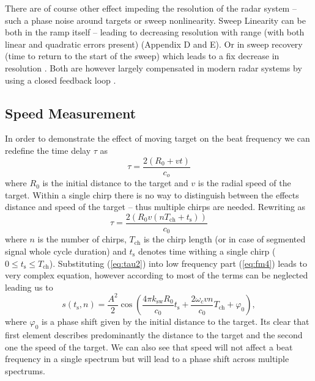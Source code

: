 There are of course other effect impeding the resolution of the radar system -- such a phase noise around targets or sweep nonlinearity.
Sweep Linearity can be both in the ramp itself -- leading to decreasing resolution with range (with both linear and quadratic errors present) \cite{graham2005} (Appendix D and E).
Or in sweep recovery (time to return to the start of the sweep) which leads to a fix decrease in resolution \cite{piper1995}.
Both are however largely compensated in modern radar systems by using a closed feedback loop \cite{graham2005}.


\subsection{Speed Measurement}

In order to demonstrate the effect of moving target on the beat frequency we can redefine the time delay $\tau$ as
\begin{equation}
  \tau = \frac{2(R_0+vt)}{c_o}
  \label{eq:tau}
\end{equation}
where $R_0$ is the initial distance to the target and $v$ is the radial speed of the target.
Within a single chirp there is no way to distinguish between the effects distance and speed of the target -- thus multiple chirps are needed.
Rewriting \label{eq:tau} as
\begin{equation}
  \tau = \frac{2(R_0 v(nT_\mathrm{ch} + t_\mathrm{s}))}{c_0}
  \label{eq:tau2}
\end{equation}
where $n$ is the number of chirps, $T_\mathrm{ch}$ is the chirp length (or in case of segmented signal whole cycle duration) and $t_\mathrm{s}$ denotes time withing  a single chirp ($0 \leq t_\mathrm{s} \leq T_\mathrm{ch}$).
Substituting (\ref{eq:tau2}) into low frequency part (\ref{eq:fm4}) leads to very complex equation, however according to \cite{suleymanov2016} most of the terms can be neglected leading us to
\begin{equation}
  s(t_\mathrm{s}, n) = \frac{A^2}{2} \cos\left(\frac{4\pi k_\mathrm{sw} R_0}{c_0} t_\mathrm{s} + \frac{2\omega_c v n}{c_0} T_\mathrm{ch} + \varphi_0 \right),
  \label{eq:fb2}
\end{equation}
where $\varphi_0$ is a phase shift given by the initial distance to the target.
Its clear that first element describes predominantly the distance to the target and the second one the speed of the target.
We can also see that speed will not affect a beat frequency in a single spectrum but will lead to a phase shift across multiple spectrums.

